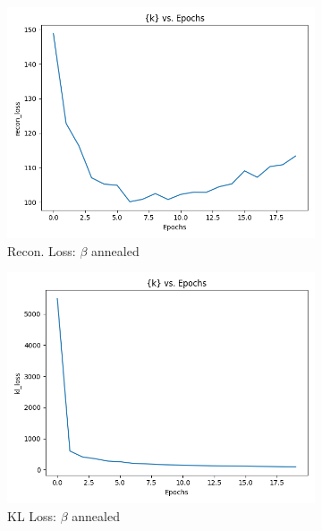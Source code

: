 \documentclass[11pt,addpoints,answers]{exam}
\numberwithin{equation}{section} %
\numberwithin{figure}{section} %
\numberwithin{table}{section} %
\begin{document}
\begin{questions}
\begin{figure}[H]
    \begin{subfigure}[b]{0.32\linewidth}
    \includegraphics[width=\linewidth]{2.2d.png}
    \caption{Recon. Loss: $\beta$ annealed}
    \end{subfigure}
    \begin{subfigure}[b]{0.32\linewidth}
    \includegraphics[width=\linewidth]{2.2e.png}
    \caption{KL Loss: $\beta$ annealed}
    \end{subfigure}
    \begin{subfigure}[b]{0.32\linewidth}

\end{subfigure}
\end{figure}
\end{questions}
\end{document}
